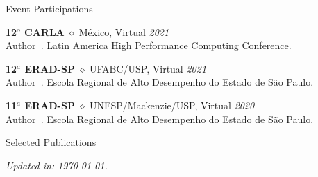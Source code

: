 \documentclass[a4paper]{resume}
\begin{document}
\begin{rSection}{Event Participations}

{\bf 12$^o$ CARLA} $\diamond$ México, Virtual \hfill {\em 2021} \\
Author~\cite{carla2021}. Latin America High Performance Computing Conference.

{\bf 12$^a$ ERAD-SP} $\diamond$ UFABC/USP, Virtual \hfill {\em 2021} \\
Author~\cite{erad2021}. Escola Regional de Alto Desempenho do Estado de São Paulo.

{\bf 11$^a$ ERAD-SP} $\diamond$ UNESP/Mackenzie/USP, Virtual \hfill {\em 2020} \\
Author~\cite{erad2020}. Escola Regional de Alto Desempenho do Estado de São Paulo.

\end{rSection}

\nocite{*}
\begin{rSection}{Selected Publications}

\renewcommand{\section}[2]{}

\end{rSection}

\vfill \hfill {\em Updated in: \today.}
\end{document}
